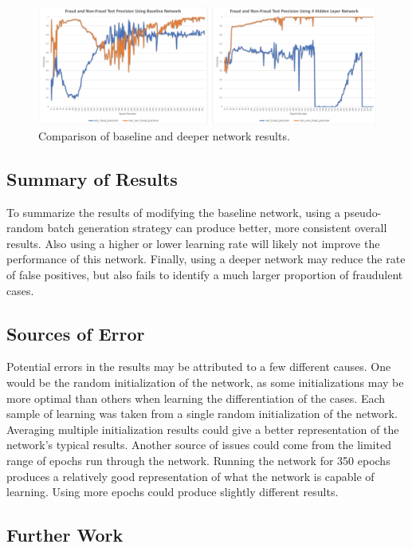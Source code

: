 \documentclass{article}
\begin{document}
\begin{figure}
  \begin{center}
    \includegraphics[width=135mm]{DeeperNetwork.pdf}
    \caption{Comparison of baseline and deeper network results.}
    \label{deeper-network}
  \end{center}
\end{figure}

\subsection{Summary of Results}

 To summarize the results of modifying the baseline network, using a pseudo-random batch
 generation strategy can produce better, more consistent overall results. Also using a higher
 or lower learning rate will likely not improve the performance of this network. Finally, using a
 deeper network may reduce the rate of false positives, but also fails to identify a much
 larger proportion of fraudulent cases.

\subsection{Sources of Error}

Potential errors in the results may be attributed to a few different causes. One
 would be the random initialization of the network, as some initializations may
 be more optimal than others when learning the differentiation of the cases. Each
 sample of learning was taken from a single random initialization of the network.
 Averaging multiple initialization results could give a better representation of the
 network’s typical results. Another source of issues could come from the limited
 range of epochs run through the network. Running the network for 350 epochs
 produces a relatively good representation of what the network is capable of
 learning. Using more epochs could produce slightly different results.

\subsection{Further Work}
\end{document}

